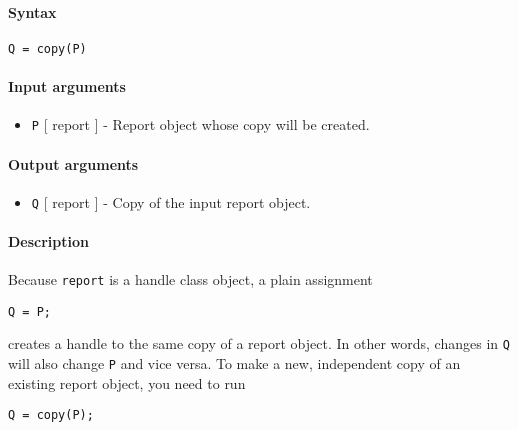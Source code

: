 


	\paragraph{Syntax}\label{syntax}

\begin{verbatim}
Q = copy(P)
\end{verbatim}

\paragraph{Input arguments}\label{input-arguments}

\begin{itemize}
\itemsep1pt\parskip0pt
\item
  \texttt{P} {[} report {]} - Report object whose copy will be created.
\end{itemize}

\paragraph{Output arguments}\label{output-arguments}

\begin{itemize}
\itemsep1pt\parskip0pt
\item
  \texttt{Q} {[} report {]} - Copy of the input report object.
\end{itemize}

\paragraph{Description}\label{description}

Because \texttt{report} is a handle class object, a plain assignment

\begin{verbatim}
Q = P;
\end{verbatim}

creates a handle to the same copy of a report object. In other words,
changes in \texttt{Q} will also change \texttt{P} and vice versa. To
make a new, independent copy of an existing report object, you need to
run

\begin{verbatim}
Q = copy(P);
\end{verbatim}


